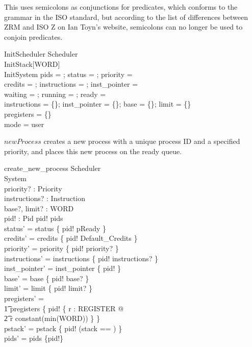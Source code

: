 \documentclass{article}
\begin{document}
This uses semicolons as conjunctions for predicates, which conforms to
the grammar in the ISO standard, but according to the list of
differences between ZRM and ISO Z on Ian Toyn's website, semicolons
can no longer be used to conjoin predicates.

\begin{schema}{InitScheduler}
    Scheduler\\
    InitStack[WORD]\\
    InitSystem
\where
    pids = \emptyset; status = \emptyset; priority = \emptyset\\
    credits = \emptyset; instructions = \emptyset; inst\_pointer = \emptyset\\
    waiting = \emptyset; running = \emptyset; ready = \langle \rangle\\
    instructions = \{\}; inst\_pointer = \{\}; base = \{\}; limit = \{\}\\
    pregisters = \{\}\\
    mode = user
\end{schema}

$newProcess$ creates a new process with a unique process ID and a
specified priority, and places this new process on the ready queue.

\begin{schema}{create\_new\_process}
  \Delta Scheduler\\
  \Xi System\\
  priority? : Priority\\
  instructions? : \seq Instruction\\
  base?, limit? : WORD\\
  pid! : Pid
\where
  pid! \notin pids\\
  status' = status \cup \{ pid! \mapsto pReady \}\\
  credits' = credits \cup \{ pid! \mapsto Default\_Credits \}\\
  priority' = priority \cup \{ pid! \mapsto priority? \}\\
  instructions' = instructions \cup \{ pid! \mapsto instructions? \}\\
  inst\_pointer' = inst\_pointer \cup \{ pid!  \}\\
  base' = base \cup \{ pid! \mapsto base? \}\\
  limit' = limit \cup \{ pid! \mapsto limit? \}\\
  pregisters' =\\
    \t1 pregisters \cup \{ pid! \mapsto \{ r : REGISTER @ \\
      \t2 r \mapsto constant(min(WORD)) \} \}\\
  pstack' =
    pstack \cup \{ pid! \mapsto (\lblot stack == \langle \rangle \rblot) \}\\
    pids' = pids \cup \{pid!\}
\end{schema}
\end{document}
